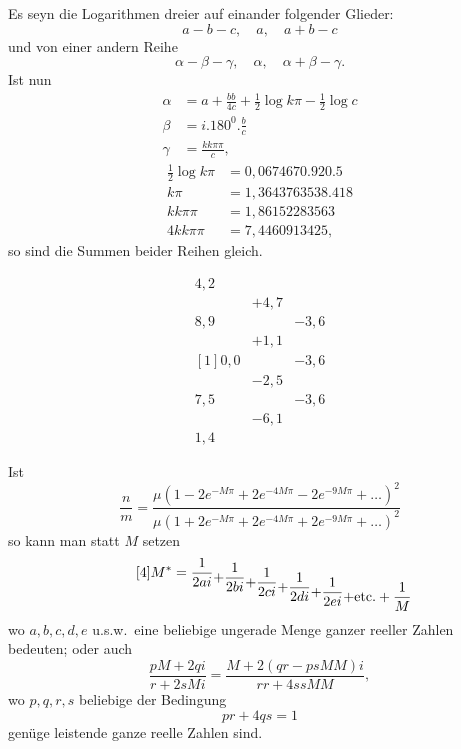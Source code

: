 \begin{center}\end{center}
\par\indent Es seyn die Logarithmen dreier auf einander folgender Glieder:
\[a-b-c,\quad a,\quad a+b-c\]
\noindent und von einer andern Reihe
\[\alpha-\beta-\gamma,\quad\alpha,\quad\alpha+\beta-\gamma.\]
\noindent Ist nun
\[\begin{aligned}
\alpha&=a+\frac{bb}{4c}+\frac12\log k\pi-\frac12\log c\\[.5em]
\beta&=i.180^0.\frac bc\\[.5em]
\gamma&=\frac{kk\pi\pi}c,
\end{aligned}\]
\[\begin{aligned}
\tfrac12\log k\pi&=0{,}0674670.920.5\\
k\pi&=1{,}3643763538.418\\
kk\pi\pi&=1{,}86152283563\\
4kk\pi\pi&=7{,}4460913425,
\end{aligned}\]
\noindent so sind die Summen beider Reihen gleich.
\clearpage{}
\begin{center}\end{center}
\[\begin{array}{|r|r|r||}
4{,}2&&\\
&+4{,}7&\\
8{,}9&&-3{,}6\\
&+1{,}1&\\
{}[1]0{,}0&&-3{,}6\\
&-2{,}5&\\
7{,}5&&-3{,}6\\
&-6{,}1&\\
1{,}4&&
\end{array}\]
\]
\par\indent Ist
\begin{equation*}\tag*{[3]}
\frac nm=\frac{\mu(1-2e^{-M\pi}+2e^{-4M\pi}-2e^{-9M\pi}+\ldots)^2}{\mu(1+2e^{-M\pi}+2e^{-4M\pi}+2e^{-9M\pi}+\ldots)^2}
\end{equation*}
\noindent so kann man statt \(M\) setzen
\begin{equation*}\tag*{[4]}
M^*=\frac1{2ai}
\raisebox{-.8ex}{$\displaystyle+\frac1{2bi}$}
\raisebox{-1.6ex}{$\displaystyle+\frac1{2ci}$}
\raisebox{-2.4ex}{$\displaystyle+\frac1{2di}$}
\raisebox{-3.2ex}{$\displaystyle+\frac1{2ei}$}
\raisebox{-4ex}{$\displaystyle+\text{etc.}+\frac1M$}
\end{equation*}
\noindent wo \(a,b,c,d,e\) u.s.w.\ eine beliebige ungerade Menge ganzer reeller Zahlen bedeuten; oder auch
\begin{equation*}\tag*{[5]}
\frac{pM+2qi}{r+2sMi}=\frac{M+2(qr-psMM)i}{rr+4ssMM},
\end{equation*}
\noindent wo \(p,q,r,s\) beliebige der Bedingung
\[pr+4qs=1\]
\noindent genüge leistende ganze reelle Zahlen sind.
\clearpage\endgroup
